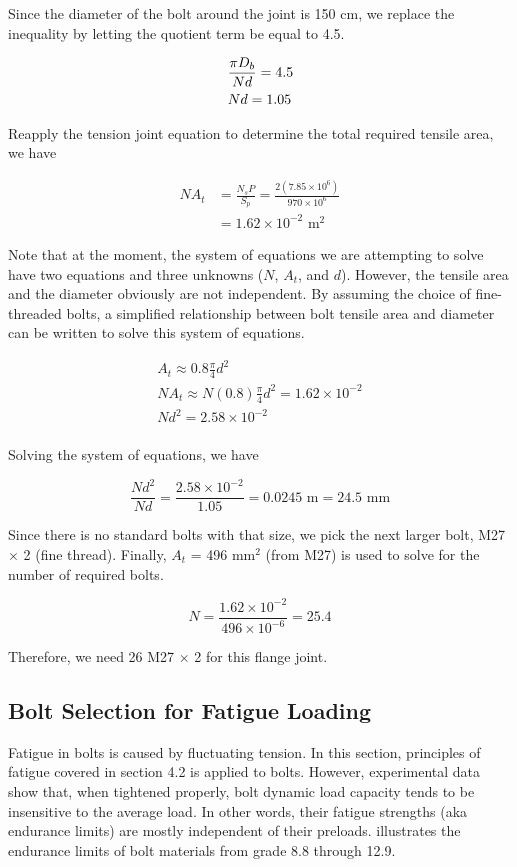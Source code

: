 \documentclass[a4paper,openany,nobib]{tufte-book}
\begin{document}
{{Since the diameter of the bolt around the joint is 150 cm, we replace
the inequality by letting the quotient term be equal to 4.5.

$$\begin{gathered}
  \frac{\pi D_b}{Nd} = 4.5 \hfill \\
  Nd = 1.05 \hfill \\ 
\end{gathered}$$

Reapply the tension joint equation to determine the total required
tensile area, we have

$$\begin{aligned}
  NA_t &= \frac{N_sP}{S_p} = \frac{2(7.85 \times 10^6)}{970 \times 10^6} \\
         &= 1.62 \times 10^{-2} \text{ m}^2\end{aligned}$$

Note that at the moment, the system of equations we are attempting to
solve have two equations and three unknowns (\(N\), \(A_t\), and \(d\)).
However, the tensile area and the diameter obviously are not
independent. By assuming the choice of fine-threaded bolts, a simplified
relationship between bolt tensile area and diameter can be written to
solve this system of equations.

$$\begin{gathered}
  A_t \approx 0.8\frac{\pi }{4}d^2 \\ 
  NA_t \approx N(0.8)\frac{\pi}{4}d^2 = 1.62 \times 10^{-2} \\ 
  Nd^2 = 2.58 \times 10^{-2} \\ 
\end{gathered}$$

Solving the system of equations, we have

$$\frac{Nd^2}{Nd} = \frac{2.58 \times 10^{-2}}{1.05} = 0.0245 \text{ m} = 24.5 \text{ mm}$$

Since there is no standard bolts with that size, we pick the next larger
bolt, M27 \(\times\) 2 (fine thread). Finally, \(A_t\) = 496 mm\(^2\) (from
M27) is used to solve for the number of required bolts.

$$N = \frac{1.62 \times 10^{-2}}{496 \times 10^{-6}} = 25.4$$

Therefore, we need 26 M27 \(\times\) 2 for this flange joint.

\subsection{Bolt Selection for Fatigue Loading}
\label{bolt-selection-for-fatigue-loading}
Fatigue in bolts is caused by fluctuating tension. In this section,
principles of fatigue covered in section 4.2 is applied to bolts.
However, experimental data show that, when tightened properly, bolt
dynamic load capacity tends to be insensitive to the average load. In
other words, their fatigue strengths (aka endurance limits) are mostly
independent of their preloads. illustrates the endurance limits of bolt
materials from grade 8.8 through 12.9.


}}
\end{document}
